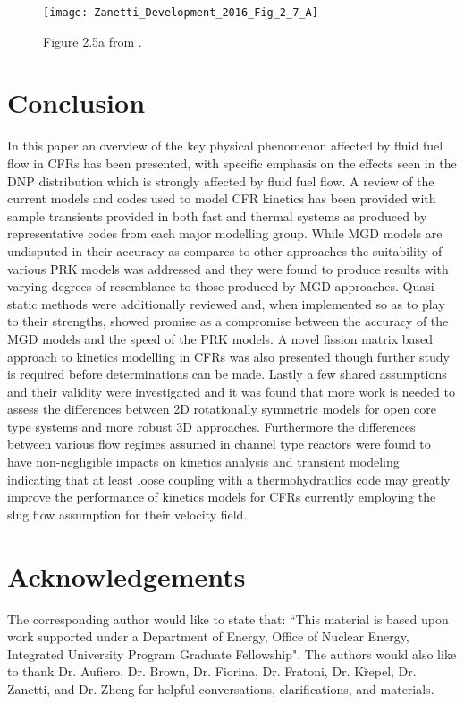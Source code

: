 \documentclass[review]{elsarticle}
\begin{document}
\begin{figure}[h]
   \centering
   \texttt{[image: Zanetti\_Development\_2016\_Fig\_2\_7\_A]}
   \caption{Figure 2.5a from \cite{zanetti_development_2016}.} 
   \label{fig:zanetti_sec_8mw}
\end{figure}

\section{Conclusion} \label{sec:conc}
In this paper an overview of the key physical phenomenon affected by fluid fuel
flow in CFRs has been presented, with specific emphasis on the effects seen
in the DNP distribution which is strongly affected by fluid fuel flow.
A review of the current models and codes used to
model CFR kinetics has been provided with sample transients provided in both
fast and thermal systems as produced by representative codes from each major
modelling group. While MGD models are undisputed in their accuracy as compares
to other approaches the suitability of various PRK models was addressed
and they were found to produce results with varying degrees of resemblance to
those produced by MGD approaches. Quasi-static methods were additionally
reviewed and, when implemented so as to play to their strengths, showed promise
as a compromise between the accuracy of the MGD models and the speed of the PRK
models. A novel fission matrix based approach to kinetics modelling in CFRs was
also presented though further study is required before determinations can be
made. Lastly a few shared assumptions and their validity were investigated and
it was found that more work is needed to assess the differences between 2D 
rotationally symmetric models for open core type systems and more robust 3D
approaches. Furthermore the differences between various flow regimes assumed
in channel type reactors were found to have non-negligible impacts on kinetics
analysis and transient modeling indicating that at least loose coupling with
a thermohydraulics code may greatly improve the performance of kinetics models
for CFRs currently employing the slug flow assumption for their velocity field.

\section{Acknowledgements} \label{sec:ack}
The corresponding author would like to state that: ``This material is based
upon work supported under a Department of Energy, Office of Nuclear Energy,
Integrated University Program Graduate Fellowship". The authors would also
like to thank Dr. Aufiero, Dr. Brown, Dr. Fiorina, Dr. Fratoni, 
Dr. K{\u r}epel, 
Dr. Zanetti, and Dr. Zheng for helpful conversations, clarifications, and
materials.  
\end{document}

